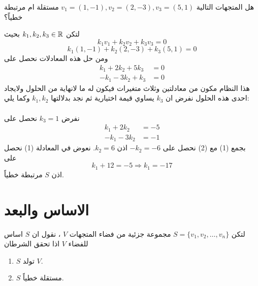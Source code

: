 \begin{example}
	هل المتجهات التالية 
	$v_1 = (1,-1), v_2 = (2,-3), v_3 = (5,1)$
	مستقلة ام مرتبطة خطياً؟
\end{example}
\begin{solution}
		لتكن $k_1,k_2,k_3\in \mathbb{R}$ بحيث 
	\[
	k_1 v_1 + k_2v_2 + k_3v_3 = 0
	\]
	\[
	k_1 (1,-1) + k_2(2,-3) + k_3(5,1) = 0
	\]
	ومن حل هذه المعادلات نحصل على 
	\begin{align*}
		k_1 + 2k_2 + 5k_3 &= 0\\
		-k_1 -3 k_2 + k_3 &= 0 
	\end{align*}
	هذا النظام مكون من معادلتين وثلاث متغيرات فيكون له ما لانهاية من الحلول ولايجاد احدى هذه الحلول نفرض ان $k_3$ يساوي قيمة اختيارية ثم نجد بدلالتها $k_1,k_2$ وكما يلي:\\
	\\
	نفرض $k_3=1$ نحصل على
	\begin{align*}
		k_1 + 2k_2 &= -5 \tag{1}\\
		-k_1 -3 k_2 &= -1\tag{2} 
	\end{align*}
	بجمع (1) مع (2) نحصل على $-k_2= -6$ اذن $k_2=6 $. نعوض في المعادلة (1) نحصل على 
	\[
	k_1 + 12 = -5 \Rightarrow k_1 = -17 
	\]
	اذن $S$ مرتبطة خطياً.
\end{solution}

\section{الاساس والبعد}
لتكن
$S = \{v_1, v_2, \dots, v_n\}$
مجموعة جزئية من فضاء المتجهات $V$ ، نقول ان $S$ اساس للفضاء $V$ اذا تحقق الشرطان 
\begin{enumerate}
	\item $S$ تولد $V$.
	\item $S$ مستقلة خطياً.
\end{enumerate}

